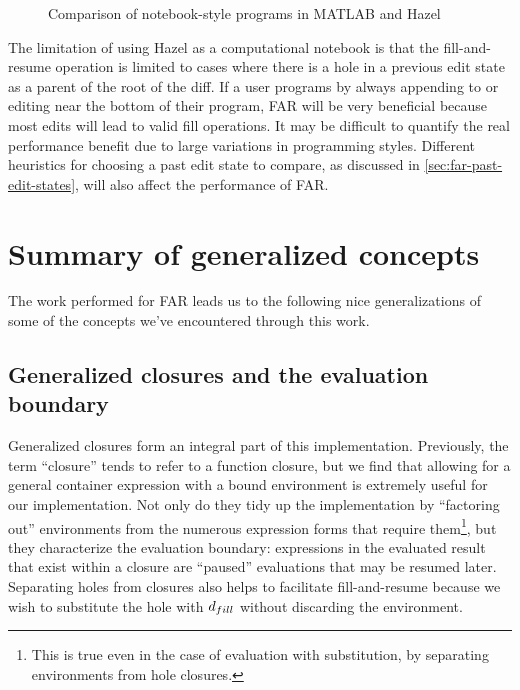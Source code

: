 \begin{figure}
  \centering
  \begin{singlespace}
  \end{singlespace}
  \caption{Comparison of notebook-style programs in MATLAB and Hazel}
  \label{fig:notebook-comparison}
\end{figure}

The limitation of using Hazel as a computational notebook is that the fill-and-resume operation is limited to cases where there is a hole in a previous edit state as a parent of the root of the diff. If a user programs by always appending to or editing near the bottom of their program, FAR will be very beneficial because most edits will lead to valid fill operations. It may be difficult to quantify the real performance benefit due to large variations in programming styles. Different heuristics for choosing a past edit state to compare, as discussed in \cref{sec:far-past-edit-states}, will also affect the performance of FAR.

\section{Summary of generalized concepts}
\label{sec:summary-generalizations}

The work performed for FAR leads us to the following nice generalizations of some of the concepts we've encountered through this work.

\subsection{Generalized closures and the evaluation boundary}
\label{sec:generalized-closures}

Generalized closures form an integral part of this implementation. Previously, the term ``closure'' tends to refer to a function closure, but we find that allowing for a general container expression with a bound environment is extremely useful for our implementation. Not only do they tidy up the implementation by ``factoring out'' environments from the numerous expression forms that require them\footnote{This is true even in the case of evaluation with substitution, by separating environments from hole closures.}, but they characterize the evaluation boundary: expressions in the evaluated result that exist within a closure are ``paused'' evaluations that may be resumed later. Separating holes from closures also helps to facilitate fill-and-resume because we wish to substitute the hole with $d_{fill}$ without discarding the environment.

